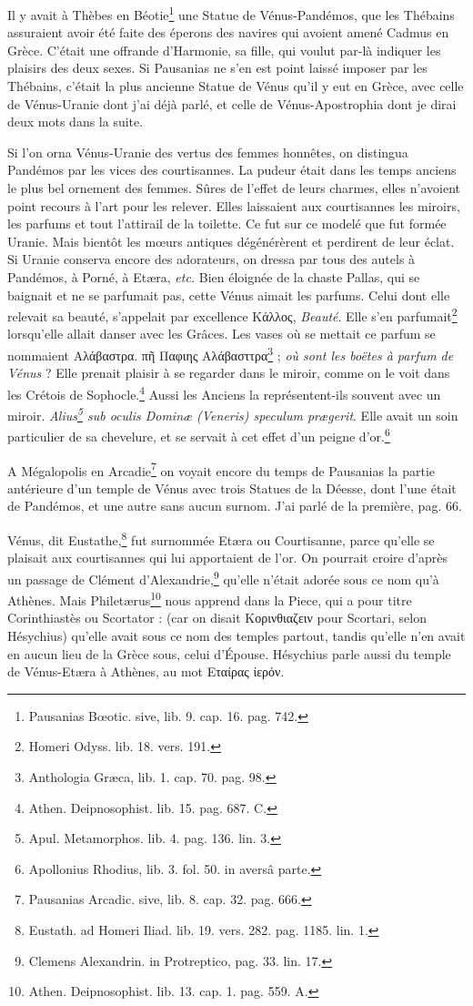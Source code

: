 \documentclass[a4paper, 11pt, oneside, polutonikogreek, french]{article}
\begin{document}
Il y avait à Thèbes en Béotie\footnote{Pausanias Bœotic. sive, lib. 9. cap. 16. pag. 742.} une Statue de Vénus-Pandémos, que les Thébains assuraient avoir été faite des éperons des navires qui avoient amené Cadmus en Grèce. C'était une offrande d'Harmonie, sa fille, qui voulut par-là indiquer les plaisirs des deux sexes. Si Pausanias ne s'en est point laissé imposer par les Thébains, c'était la plus ancienne Statue de Vénus qu'il y eut en Grèce, avec celle de Vénus-Uranie dont j'ai déjà parlé, et celle de Vénus-Apostrophia dont je dirai deux mots dans la suite.

Si l'on orna Vénus-Uranie des vertus des femmes honnêtes, on distingua Pandémos par les vices des courtisannes. La pudeur était dans les temps anciens le plus bel ornement des femmes. Sûres de l'effet de leurs charmes, elles n'avoient point recours à l'art pour les relever. Elles laissaient aux courtisannes les miroirs, les parfums et tout l'attirail de la toilette. Ce fut sur ce modelé que fut formée Uranie. Mais bientôt les mœurs antiques dégénérèrent et perdirent de leur éclat. Si Uranie conserva encore des adorateurs, on dressa par tous des autels à Pandémos, à Porné, à Etæra, \emph{etc.} Bien éloignée de la chaste Pallas, qui se baignait et ne se parfumait pas, cette Vénus aimait les parfums. Celui dont elle relevait sa beauté, s'appelait par excellence Κάλλος, \emph{Beauté}. Elle s'en parfumait\footnote{Homeri Odyss. lib. 18. vers. 191.} lorsqu'elle allait danser avec les Grâces. Les vases où se mettait ce parfum se nommaient Αλάβαστρα. πῆ Παφιης Αλάβασττρα\footnote{Anthologia Græca, lib. 1. cap. 70. pag. 98.} ; \emph{où sont les boëtes à parfum de Vénus} ? Elle prenait plaisir à se regarder dans le miroir, comme on le voit dans les Crétois de Sophocle.\footnote{Athen. Deipnosophist. lib. 15. pag. 687. C.} Aussi les Anciens la représentent-ils souvent avec un miroir. \emph{Alius\footnote{Apul. Metamorphos. lib. 4. pag. 136. lin. 3.} sub oculis Dominæ (Veneris) speculum prægerit}. Elle avait un soin particulier de sa chevelure, et se servait à cet effet d'un peigne d'or.\footnote{Apollonius Rhodius, lib. 3. fol. 50. in aversâ parte.}

A Mégalopolis en Arcadie\footnote{Pausanias Arcadic. sive, lib. 8. cap. 32. pag. 666.} on voyait encore du temps de Pausanias la partie antérieure d'un temple de Vénus avec trois Statues de la Déesse, dont l'une était de Pandémos, et une autre sans aucun surnom. J'ai parlé de la première, pag. 66.

Vénus, dit Eustathe,\footnote{Eustath. ad Homeri Iliad. lib. 19. vers. 282. pag. 1185. lin. 1.} fut surnommée Etæra ou Courtisanne, parce qu'elle se plaisait aux courtisannes qui lui apportaient de l'or. On pourrait croire d'après un passage de Clément d'Alexandrie,\footnote{Clemens Alexandrin. in Protreptico, pag. 33. lin. 17.} qu'elle n'était adorée sous ce nom qu'à Athènes. Mais Philetærus\footnote{Athen. Deipnosophist. lib. 13. cap. 1. pag. 559. A.} nous apprend dans la Piece, qui a pour titre Corinthiastès ou Scortator : (car on disait Κορινθιαζειν pour Scortari, selon Hésychius) qu'elle avait sous ce nom des temples partout, tandis qu'elle n'en avait en aucun lieu de la Grèce sous, celui d'Épouse. Hésychius parle aussi du temple de Vénus-Etæra à Athènes, au mot Εταίρας ίερόν.
\end{document}
